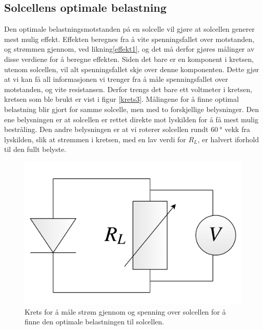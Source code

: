 \documentclass[%
 reprint,
 amsmath,amssymb,
 aps,
 norsk,
 booktabs
]{revtex4-1}
\begin{document}
\subsection{Solcellens optimale belastning}
Den optimale belastningsmotstanden på en solcelle vil gjøre at solcellen generer mest mulig effekt. Effekten beregnes fra å vite spenningsfallet over motstanden, og strømmen gjennom, ved likning\eqref{effekt1}, og det må derfor gjøres målinger av disse verdiene for å beregne effekten. Siden det bare er en komponent i kretsen, utenom solcellen, vil alt spenningsfallet skje over denne komponenten. Dette gjør at vi kan få all informasjonen vi trenger fra å måle spenningsfallet over motstanden, og vite resistansen. Derfor trengs det bare ett voltmeter i kretsen, kretsen som ble brukt er vist i figur \vref{krets3}. Målingene for å finne optimal belastning blir gjort for samme solcelle, men med to forskjellige belysninger. Den ene belysningen er at solcellen er rettet direkte mot lyskilden for å få mest mulig bestråling. Den andre belysningen er at vi roterer solcellen rundt $\SI{60}{\degree}$ vekk fra lyskilden, slik at strømmen i kretsen, med en lav verdi for $R_L$, er halvert iforhold til den fullt belyste.
\begin{figure}[h!]
  \centering
  \includegraphics[scale=0.11]{krets3.png}
  \caption{Krets for å måle strøm gjennom og spenning over solcellen for å finne den optimale belastningen til solcellen.}
  \label{krets3}
\end{figure}
\end{document}
